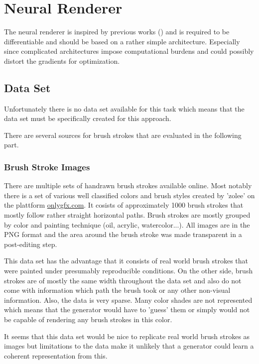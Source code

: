 \section{Neural Renderer}

The neural renderer is inspired by previous works () and 
is required to be differentiable and should be based on a rather simple architecture.
Especially since complicated architectures impose computational burdens and could
possibly distort the gradients for optimization.

\subsection{Data Set}

Unfortunately there is no data set available for this task which means that the data set
must be specifically created for this approach.

There are several sources for brush strokes that are evaluated in the following part.


\subsubsection{Brush Stroke Images}

There are multiple sets of handrawn brush strokes available online.
Most notably there is a set of various well classified colors and brush styles created
by 'zolee'  on the plattform \url{onlygfx.com}.
It cosists of approximately 1000 brush strokes that mostly follow rather straight
horizontal paths.
Brush strokes are mostly grouped by color and painting technique (oil, acrylic, watercolor...).
All images are in the PNG format and the area around the brush stroke was made 
transparent in a post-editing step.

This data set has the advantage that it consists of real world brush strokes that
were painted under presumably reproducible conditions.
On the other side, brush strokes are of mostly the same width throughout the data set
and also do not come with information which path the brush took or any other non-visual
information.
Also, the data is very sparse.
Many color shades are not represented which means that the generator would have to
'guess' them or simply would not be capable of rendering any brush strokes in this color.

It seems that this data set would be nice to replicate real world brush strokes
as images but limitations to the data make it unlikely that a generator could learn
a coherent representation from this.

